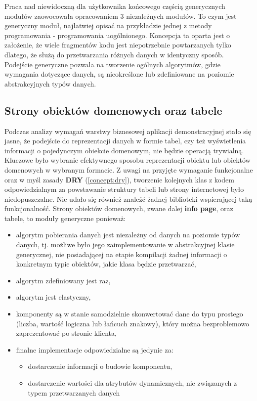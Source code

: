 	Praca nad niewidoczną dla użytkownika końcowego częścią generycznych modułów zaowocowała opracowaniem 3 niezależnych modułów. To czym jest generyczny moduł, najłatwiej opisać na przykładzie jednej z metody programowania - programowania uogólnionego. Koncepcja ta oparta jest o założenie, że wiele fragmentów kodu jest niepotrzebnie powtarzanych tylko dlatego, że służą do przetwarzania różnych danych w identyczny sposób. Podejście generyczne pozwala na tworzenie ogólnych algorytmów, gdzie wymagania dotyczące danych, są nieokreślone lub zdefiniowane na poziomie abstrakcyjnych typów danych. 

\subsection{Strony obiektów domenowych oraz tabele}
	Podczas analizy wymagań warstwy biznesowej aplikacji demonstracyjnej stało się jasne, że podejście do reprezentacji danych w formie tabel, czy też wyświetlenia informacji o pojedynczym obiekcie domenowym, nie będzie operacją trywialną. Kluczowe było wybranie efektywnego sposobu reprezentacji obiektu lub obiektów domenowych w wybranym formacie. Z uwagi na przyjęte wymaganie funkcjonalne oraz w myśl zasady \textbf{DRY} (\ref{concept:dry}), tworzenie kolejnych klas z kodem odpowiedzialnym za powstawanie struktury tabeli lub strony internetowej było niedopuszczalne. Nie udało się również znaleźć żadnej biblioteki wspierającej taką funkcjonalność. Strony obiektów domenowych, zwane dalej \textbf{info page}, oraz tabele, to moduły generyczne ponieważ:
	\begin{itemize}
		\item algorytm pobierania danych jest niezależny od danych na poziomie typów danych, tj. możliwe było jego zaimplementowanie w abstrakcyjnej klasie generycznej, nie posiadającej na etapie kompilacji żadnej informacji o konkretnym typie obiektów, jakie klasa będzie przetwarzać,
		\item algorytm zdefiniowany jest raz,
		\item algorytm jest elastyczny,
		\item komponenty są w stanie samodzielnie skonwertować dane do typu prostego (liczba, wartość logiczna lub łańcuch znakowy), który można bezproblemowo zaprezentować po stronie klienta,
		\item finalne implementacje odpowiedzialne są jedynie za:
		\begin{itemize}
			\item dostarczenie informacji o budowie komponentu,
			\item dostarczenie wartości dla atrybutów dynamicznych, nie związanych z typem przetwarzanych danych
		\end{itemize}		 
	\end{itemize}
	
